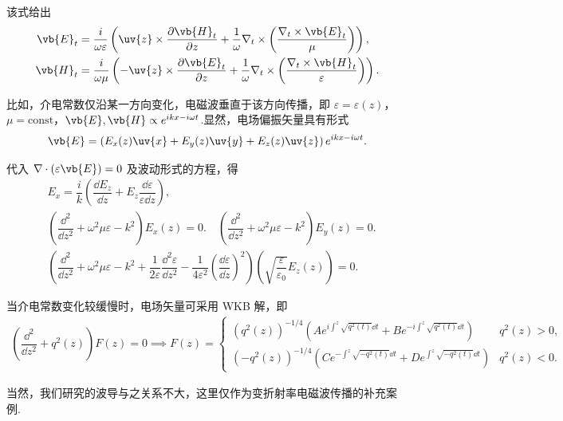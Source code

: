 该式给出
\begin{align*}
	\vb{E}_t &= \frac{i}{\omega\varepsilon} \left( \uv{z} \times \frac{\partial \vb{H}_t}{\partial z} + \frac{1}{\omega} \nabla_t \times \left( \frac{\nabla_t \times \vb{E}_t}{\mu} \right) \right),\\
	\vb{H}_t &= \frac{i}{\omega\mu} \left( -\uv{z} \times \frac{\partial \vb{E}_t}{\partial z} + \frac{1}{\omega} \nabla_t \times \left( \frac{\nabla_t \times \vb{H}_t}{\varepsilon} \right) \right).
\end{align*}
\begin{note}
	比如，介电常数仅沿某一方向变化，电磁波垂直于该方向传播，即 \(\varepsilon = \varepsilon(z)\)，\(\mu = \text{const}\)，\(\vb{E}, \vb{H} \propto e^{ikx - i\omega t}\).显然，电场偏振矢量具有形式
	\begin{align*}
		\vb{E} = \left( E_x(z) \uv{x} + E_y(z) \uv{y} + E_z(z) \uv{z} \right) e^{ikx - i\omega t}.
	\end{align*}

	代入 \(\nabla \cdot (\varepsilon \vb{E}) = 0\) 及波动形式的方程，得
	\begin{align*}
		&E_x = \dfrac{i}{k} \left( \dfrac{\dd  E_z}{\dd z} + E_z \dfrac{\dd \varepsilon}{\varepsilon \dd z} \right), \\
		&\left( \dfrac{\dd^2}{\dd z^2} + \omega^2 \mu\varepsilon - k^2 \right) E_x(z) = 0.\quad \left( \dfrac{\dd^2}{\dd z^2} + \omega^2 \mu\varepsilon - k^2 \right) E_y(z)= 0. \\
		&\left( \dfrac{\dd^2}{\dd z^2} + \omega^2 \mu\varepsilon - k^2 + \dfrac{1}{2\varepsilon} \dfrac{\dd^2\varepsilon}{\dd z^2} - \dfrac{1}{4\varepsilon^2} \left( \dfrac{\dd \varepsilon}{\dd z} \right)^2 \right) \left( \sqrt{\dfrac{\varepsilon}{\varepsilon_0}} E_z(z) \right) = 0.
	\end{align*}

	当介电常数变化较缓慢时，电场矢量可采用 WKB 解，即
	\begin{align*}
		\left( \dfrac{\dd^2}{\dd z^2} + q^2(z) \right) F(z) = 0 \implies F(z) =
		\begin{cases}
			\left( q^2(z) \right)^{-1/4} \left( A e^{i \int^z \sqrt{q^2(t)} \dd t} + B e^{-i \int^z \sqrt{q^2(t)} \dd t} \right) & q^2(z) > 0, \\
			\left( -q^2(z) \right)^{-1/4} \left( C e^{- \int^z \sqrt{-q^2(t)} \dd t} + D e^{\int^z \sqrt{-q^2(t)} \dd t} \right) & q^2(z) < 0.
		\end{cases}
	\end{align*}

	当然，我们研究的波导与之关系不大，这里仅作为变折射率电磁波传播的补充案例.
\end{note}

